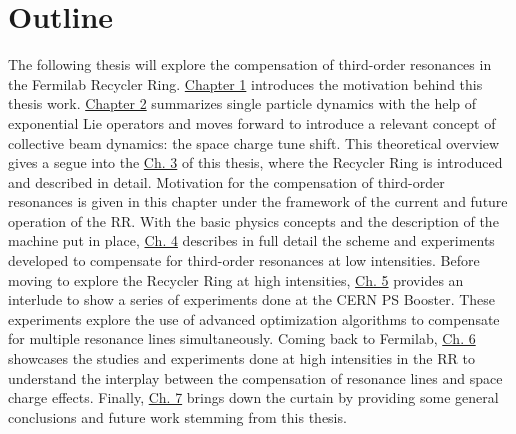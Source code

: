 \section{Outline}

The following thesis will explore the compensation of third-order resonances in the Fermilab Recycler Ring. \hyperref[sec:ch1]{Chapter 1} introduces the motivation behind this thesis work. \hyperref[sec:ch2]{Chapter 2} summarizes single particle dynamics with the help of exponential Lie operators and moves forward to introduce a relevant concept of collective beam dynamics: the space charge tune shift. This theoretical overview gives a segue into the \hyperref[sec:ch3]{Ch. 3} of this thesis, where the Recycler Ring is introduced and described in detail. Motivation for the compensation of third-order resonances is given in this chapter under the framework of the current and future operation of the RR. With the basic physics concepts and the description of the machine put in place, \hyperref[sec:ch4]{Ch. 4} describes in full detail the scheme and experiments developed to compensate for third-order resonances at low intensities. Before moving to explore the Recycler Ring at high intensities, \hyperref[sec:ch5]{Ch. 5} provides an interlude to show a series of experiments done at the CERN PS Booster. These experiments explore the use of advanced optimization algorithms to compensate for multiple resonance lines simultaneously. Coming back to Fermilab, \hyperref[sec:ch6]{Ch. 6} showcases the studies and experiments done at high intensities in the RR to understand the interplay between the compensation of resonance lines and space charge effects. Finally, \hyperref[sec:ch7]{Ch. 7} brings down the curtain by providing some general conclusions and future work stemming from this thesis.